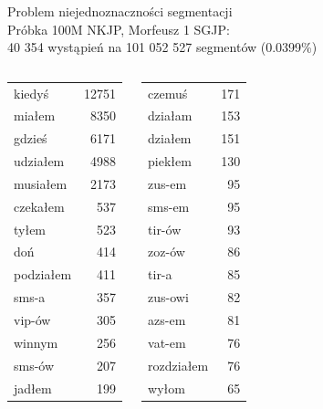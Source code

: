 \documentclass[xcolor=dvipsnames,polish]{beamer}
\begin{document}
\begin{frame}{Problem niejednoznaczności segmentacji}
  \\
  Próbka 100M NKJP, Morfeusz 1 SGJP:\\
  40 354 wystąpień na 101 052 527 segmentów (0.0399\%)
  \begin{columns}[c]
    \begin{center}
      \footnotesize
      \begin{tabular}{l|r}
        kiedyś & 12751 \\
        miałem & 8350 \\
        gdzieś & 6171 \\
        udziałem & 4988 \\
        musiałem & 2173 \\
        czekałem & 537 \\
        tyłem & 523 \\
        doń & 414 \\
        podziałem & 411 \\
        sms-a & 357 \\
        vip-ów & 305 \\
        winnym & 256 \\
        sms-ów & 207 \\
        jadłem & 199 \\
      \end{tabular}
    \end{center}
    \begin{center}
      \footnotesize
      \begin{tabular}{l|r}
        czemuś & 171 \\
        działam & 153 \\
        działem & 151 \\
        piekłem & 130 \\
        zus-em & 95 \\
        sms-em & 95 \\
        tir-ów & 93 \\
        zoz-ów & 86 \\
        tir-a & 85 \\
        zus-owi & 82 \\
        azs-em & 81 \\
        vat-em & 76 \\
        rozdziałem & 76 \\
        wyłom & 65 \\

\end{tabular}
\end{center}
\end{columns}
\end{frame}
\end{document}
